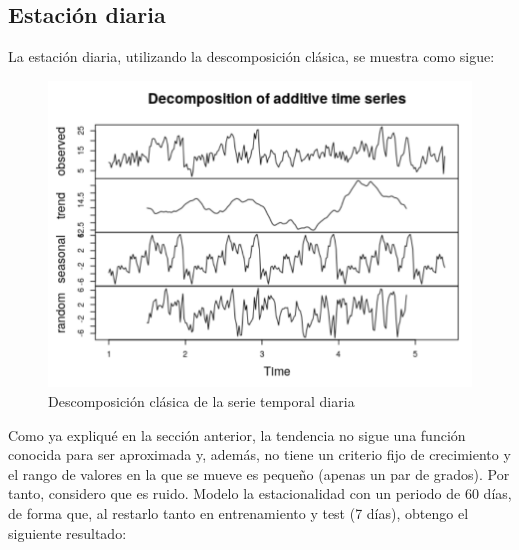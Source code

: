 \subsection{Estación diaria}

La estación diaria, utilizando la descomposición clásica, se muestra como sigue:

 \begin{figure}[H] %
 	\centering
 	\includegraphics[scale=0.31]{decomp-diario.png}  %
 	\caption{Descomposición clásica de la serie temporal diaria} 
 	\label{fig:decomp-diaria}
 \end{figure}

Como ya expliqué en la sección anterior, la tendencia no sigue una función conocida para ser aproximada y, además, no tiene un criterio fijo de crecimiento y el rango de valores en la que se mueve es pequeño (apenas un par de grados). Por tanto, considero que es ruido. Modelo la estacionalidad con un periodo de 60 días, de forma que, al restarlo tanto en entrenamiento y test (7 días), obtengo el siguiente resultado:

